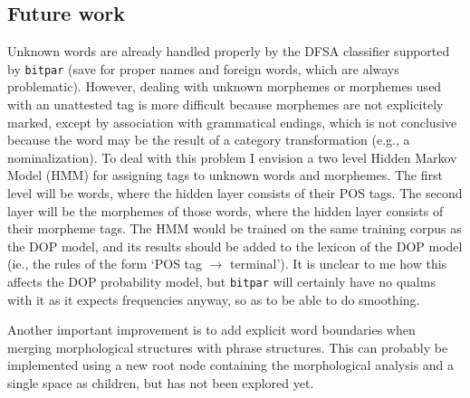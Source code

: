 \documentclass[10pt,a4paper]{article}
\begin{document}
\begin{comment}
\subsection{Evaluation}

Tenfold testing of Monato treebank, with and without regard for
morphology.

To be done. Unfortunately parsing using the full monato corpus proved to be
too much for bitpar, as it fails with a memory allocation error before
producing any results. Alternatives would be to sample from the subtrees (ie.,
sample from the rules containing IDs plus all the rules without IDs), or using
a different parser, one optimised more for memory usage.
\end{comment}

\subsection{Future work}

Unknown words are already handled properly by the DFSA classifier supported by
\texttt{bitpar} (save for proper names and foreign words, which are always
problematic). However, dealing with unknown morphemes or morphemes used with an
unattested tag is more difficult because morphemes are not explicitely marked,
except by association with grammatical endings, which is not conclusive because
the word may be the result of a category transformation (e.g., a nominalization).
To deal with this problem I envision a two level Hidden Markov Model (HMM) for
assigning tags to unknown words and morphemes. The first level will be words,
where the hidden layer consists of their POS tags. The second layer will be the
morphemes of those words, where the hidden layer consists of their morpheme
tags. The HMM would be trained on the same training corpus as the DOP model,
and its results should be added to the lexicon of the DOP model (ie., the rules
of the form `POS tag $\rightarrow$ terminal'). It is unclear to me how this
affects the DOP probability model, but \texttt{bitpar} will certainly have no
qualms with it as it expects frequencies anyway, so as to be able to do
smoothing.

Another important improvement is to add explicit word boundaries when merging
morphological structures with phrase structures. This can probably be
implemented using a new root node containing the morphological analysis and a
single space as children, but has not been explored yet.
\end{document}
